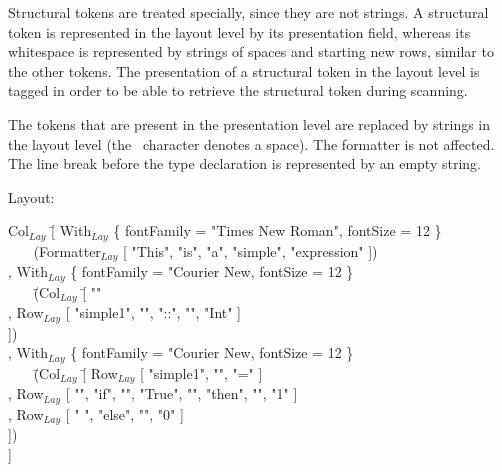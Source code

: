 Structural tokens are treated specially, since they are not strings. A structural token is represented in the layout level by its presentation field, whereas its whitespace is represented by strings of spaces and starting new rows, similar to the other tokens. The presentation of a structural token in the layout level is tagged in order to be able to retrieve the structural token during scanning.



 The tokens that are present in the presentation level are replaced by strings in the layout level (the \textvisiblespace~character denotes a space). The formatter is not affected. The line break before the type declaration is represented by an empty string. 

Layout:
\small \ttfamily
\begin{tabbing}
Col$_{Lay}$ \= [  With$_{Lay}$ \{ fontFamily = "Times New Roman", fontSize = 12 \}\\
                    \>  ~~~ (Formatter$_{Lay}$ [ "This", "is", "a", "simple", "expression" ])\\
                    \> , With$_{Lay}$ \{ fontFamily = "Courier New,  fontSize = 12 \}\\
                    \>  ~~~ \= (Col$_{Lay}$ \= [ "" \\
                    \>          \>        \> , Row$_{Lay}$ [ "simple1", "\textvisiblespace", "::",
                                                                           "\textvisiblespace", "Int" ]\\
                    \>          \>        \> ])\\
                    \> , With$_{Lay}$ \{ fontFamily = "Courier New,  fontSize = 12 \}\\
                    \>  ~~~ \= (Col$_{Lay}$ \= [ Row$_{Lay}$ [ "simple1", "\textvisiblespace", "=" ]\\
                    \>          \>        \> , Row$_{Lay}$  [ "\textvisiblespace\textvisiblespace", 
                                                                             "if", "\textvisiblespace", "True", "\textvisiblespace", 
                                                                             "then", "\textvisiblespace", "1" ]\\
                    \>          \>        \> , Row$_{Lay}$ [ "\textvisiblespace\textvisiblespace\textvisiblespace
                                                                             \textvisiblespace\textvisiblespace\textvisiblespace
                                                                             \textvisiblespace\textvisiblespace\textvisiblespace                                                                                         \textvisiblespace ", "else", "\textvisiblespace", "0" ]\\
                    \>          \>        \> ])\\
                    \> ]
\end{tabbing}
\rmfamily \normalsize


